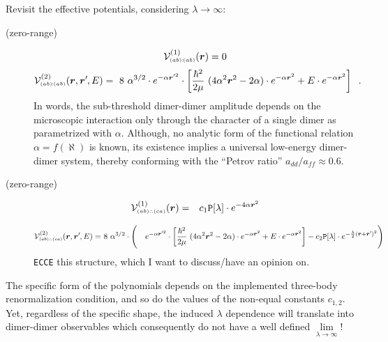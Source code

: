 \documentclass[onecolumn,preprint,superscriptaddress,nofootinbib,notitlepage,10pt,linenumbers]{revtex4-1}
\newcommand*{\mprime}{^{\prime}\mkern-1.2mu}
\newcommand{\la}{\label}
\newcommand{\be}{\begin{equation}}
\newcommand{\ee}{\end{equation}}
\newcommand{\ve}[1]{\ensuremath{\boldsymbol{#1}}}
\newcommand{\abab}{\ensuremath $(ab)\!\!:\!\!(ab)$}
\newcommand{\abca}{\ensuremath $(ab)\wasytherefore(ca)$}
\begin{document}
Revisit the effective potentials, considering $\lambda\to\infty$:
\begin{description}
	\item[(zero-range)~\abab]
\be\la{eq.local.abab}
\mathcal{V}^{(1)}_{\text{\tiny\abab}}(\ve{r})=0
\ee
\be\la{eq.nonlocal.abab}
\mathcal{V}^{(2)}_{\text{\tiny\abab}}(\ve{r},\ve{r}\mprime,E)=
~8~\alpha^{3/2}\cdot e^{-\alpha\ve{r}\mprime^2}\cdot
\left[\frac{\hbar^2}{2\mu}~(4\alpha^2\ve{r}^2-2\alpha)
\cdot e^{-\alpha\ve{r}^2}+
E\cdot e^{-\alpha\ve{r}^2}\right]\;\;.
\ee
In words, the sub-threshold dimer-dimer amplitude depends on the microscopic interaction only through the
character of a single dimer as parametrized with $\alpha$. Although, no analytic form of the functional relation
$\alpha=f(\aleph)$ is known, its existence implies a universal low-energy dimer-dimer system, thereby conforming with
the ``Petrov ratio'' $a_{dd}/a_{ff}\approx0.6$. 
\item[(zero-range)~\abca]
\begin{eqnarray}\la{eq.local.abca}
\mathcal{V}^{(1)}_{\text{\tiny\abca}}(\ve{r})&=&
c_1\texttt{P}[\lambda]\cdot
 e^{-4\alpha\ve{r}^2}
\end{eqnarray}


\begin{eqnarray}\la{eq.nonlocal.abca}
\mathcal{V}^{(2)}_{\text{\tiny\abca}}(\ve{r},\ve{r}\mprime,E)=&~8~\alpha^{3/2}\cdot\Bigg(&e^{-\alpha\ve{r}\mprime^2}\cdot
\left[\frac{\hbar^2}{2\mu}~(4\alpha^2\ve{r}^2-2\alpha)
\cdot e^{-\alpha\ve{r}^2}+
E\cdot e^{-\alpha\ve{r}^2}\right]-c_2\texttt{P}[\lambda]\cdot
 e^{-\frac{\lambda}{2}(\ve{r}+\ve{r}\mprime)^2}\Bigg)
\end{eqnarray}
\texttt{ECCE} this structure, which I want to discuss/have an opinion on.

\end{description}
The specific form of the polynomials depends on the implemented three-body renormalization condition, and so do
the values of the non-equal constants $c_{1,2}$. Yet, regardless of the specific shape, the induced $\lambda$ dependence
will translate into dimer-dimer observables which consequently do not have a well defined $\lim\limits_{\lambda\to\infty}$!


\end{document}

